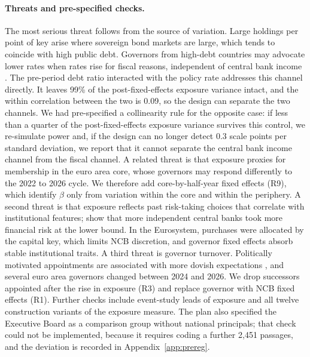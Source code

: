 \documentclass[11pt]{article}
\theoremstyle{plain}
\begin{document}
\paragraph{Threats and pre-specified checks.}
The most serious threat follows from the source of variation. Large holdings per point of key arise where sovereign bond markets are large, which tends to coincide with high public debt. Governors from high-debt countries may advocate lower rates when rates rise for fiscal reasons, independent of central bank income \citep[see][]{heinemann2026}. The pre-period debt ratio interacted with the policy rate addresses this channel directly. It leaves 99\% of the post-fixed-effects exposure variance intact, and the within correlation between the two is 0.09, so the design can separate the two channels. We had pre-specified a collinearity rule for the opposite case: if less than a quarter of the post-fixed-effects exposure variance survives this control, we re-simulate power and, if the design can no longer detect $0.3$ scale points per standard deviation, we report that it cannot separate the central bank income channel from the fiscal channel. A related threat is that exposure proxies for membership in the euro area core, whose governors may respond differently to the 2022 to 2026 cycle. We therefore add core-by-half-year fixed effects (R9), which identify $\beta$ only from variation within the core and within the periphery. A second threat is that exposure reflects past risk-taking choices that correlate with institutional features; \citet{bartels2026} show that more independent central banks took more financial risk at the lower bound. In the Eurosystem, purchases were allocated by the capital key, which limits NCB discretion, and governor fixed effects absorb stable institutional traits. A third threat is governor turnover. Politically motivated appointments are associated with more dovish expectations \citep{imf2026governors}, and several euro area governors changed between 2024 and 2026. We drop successors appointed after the rise in exposure (R3) and replace governor with NCB fixed effects (R1). Further checks include event-study leads of exposure and all twelve construction variants of the exposure measure. The plan also specified the Executive Board as a comparison group without national principals; that check could not be implemented, because it requires coding a further 2{,}451 passages, and the deviation is recorded in Appendix~\ref{app:prereg}.
\end{document}

